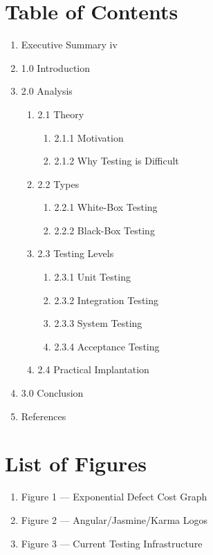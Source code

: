 \documentclass[12pt]{report}
\begin{document}
\newpage\thispagestyle{fancy}\sectionfont{\scshape}
\section*{Table of Contents}
\normalsize
\begin{enumerate}[label={},leftmargin=*,labelsep=2ex]
	\item Executive Summary \dotfill iv
    \item 1.0 Introduction 
    \item 2.0 Analysis 
    \begin{enumerate}[label*={},leftmargin=*,labelsep=2ex]
    	\item 2.1 Theory 
      	\begin{enumerate}[label*={},leftmargin=*,labelsep=2ex]
        	\item 2.1.1 Motivation 
        	\item 2.1.2 Why Testing is Difficult 
      	\end{enumerate}
      	\item 2.2 Types 
      	\begin{enumerate}[label*={},leftmargin=*,labelsep=2ex]
        	\item 2.2.1 White-Box Testing 
        	\item 2.2.2 Black-Box Testing 
      	\end{enumerate}
      	\item 2.3 Testing Levels 
      	\begin{enumerate}[label*={},leftmargin=*,labelsep=2ex]
        	\item 2.3.1 Unit Testing 
        	\item 2.3.2 Integration Testing 
        	\item 2.3.3 System Testing 
        	\item 2.3.4 Acceptance Testing 
      	\end{enumerate}
      	\item 2.4 Practical Implantation 
    \end{enumerate}
    \item 3.0 Conclusion 
    \item References 
\end{enumerate}

\newpage\thispagestyle{fancy}\sectionfont{\scshape}
\section*{List of Figures}
\normalsize{}
\begin{enumerate}[label*={},leftmargin=*,labelsep=2ex,ref=\arabic*]
    \item Figure 1 --- Exponential Defect Cost Graph 
    \item Figure 2 --- Angular/Jasmine/Karma Logos 
	\item Figure 3 --- Current Testing Infrastructure 
\end{enumerate}
\end{document}

